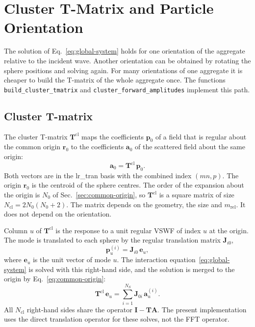\documentclass[11pt,a4paper]{article}
\begin{document}
\section{Cluster T-Matrix and Particle Orientation}
\label{sec:cluster-tmatrix}

The solution of Eq.~\eqref{eq:global-system} holds for one orientation of the aggregate relative to the incident wave.
Another orientation can be obtained by rotating the sphere positions and solving again.
For many orientations of one aggregate it is cheaper to build the T-matrix of the whole aggregate once.
The functions \texttt{build\_cluster\_tmatrix} and \texttt{cluster\_forward\_amplitudes} implement this path.

\subsection{Cluster T-matrix}

The cluster T-matrix $\mathbf{T}^\mathrm{cl}$ maps the coefficients $\bm{p}_0$ of a field that is regular about the common origin $\bm{r}_0$ to the coefficients $\bm{a}_0$ of the scattered field about the same origin:
\begin{equation}
  \bm{a}_0 = \mathbf{T}^\mathrm{cl}\,\bm{p}_0.
  \label{eq:cluster-tmatrix}
\end{equation}
Both vectors are in the lr\_tran basis with the combined index $(mn, p)$.
The origin $\bm{r}_0$ is the centroid of the sphere centres.
The order of the expansion about the origin is $N_0$ of Sec.~\ref{sec:common-origin}, so $\mathbf{T}^\mathrm{cl}$ is a square matrix of size $N_\mathrm{cl} = 2N_0(N_0+2)$.
The matrix depends on the geometry, the size and $m_\mathrm{rel}$.
It does not depend on the orientation.

Column $u$ of $\mathbf{T}^\mathrm{cl}$ is the response to a unit regular VSWF of index $u$ at the origin.
The mode is translated to each sphere by the regular translation matrix $\mathbf{J}_{i0}$,
\begin{equation}
  \bm{p}_u^{(i)} = \mathbf{J}_{i0}\,\bm{e}_u,
  \label{eq:cluster-rhs}
\end{equation}
where $\bm{e}_u$ is the unit vector of mode $u$.
The interaction equation~\eqref{eq:global-system} is solved with this right-hand side, and the solution is merged to the origin by Eq.~\eqref{eq:common-origin}:
\begin{equation}
  \mathbf{T}^\mathrm{cl}\,\bm{e}_u = \sum_{i=1}^{N_S} \mathbf{J}_{0i}\,\bm{a}_u^{(i)}.
  \label{eq:cluster-column}
\end{equation}
All $N_\mathrm{cl}$ right-hand sides share the operator $\mathbf{I} - \mathbf{T}\mathbf{A}$.
The present implementation uses the direct translation operator for these solves, not the FFT operator.
\end{document}
